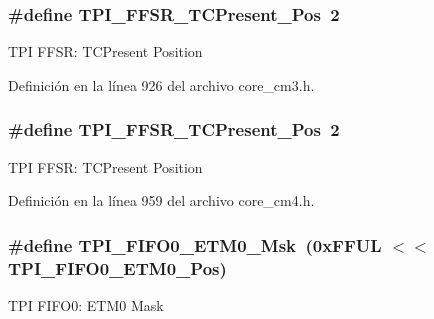 \subsubsection[{\texorpdfstring{T\+P\+I\+\_\+\+F\+F\+S\+R\+\_\+\+T\+C\+Present\+\_\+\+Pos}{TPI_FFSR_TCPresent_Pos}}]{\setlength{\rightskip}{0pt plus 5cm}\#define T\+P\+I\+\_\+\+F\+F\+S\+R\+\_\+\+T\+C\+Present\+\_\+\+Pos~2}\hypertarget{group___c_m_s_i_s___t_p_i_gad30fde0c058da2ffb2b0a213be7a1b5c}{}\label{group___c_m_s_i_s___t_p_i_gad30fde0c058da2ffb2b0a213be7a1b5c}
T\+PI F\+F\+SR\+: T\+C\+Present Position 

Definición en la línea 926 del archivo core\+\_\+cm3.\+h.

\subsubsection[{\texorpdfstring{T\+P\+I\+\_\+\+F\+F\+S\+R\+\_\+\+T\+C\+Present\+\_\+\+Pos}{TPI_FFSR_TCPresent_Pos}}]{\setlength{\rightskip}{0pt plus 5cm}\#define T\+P\+I\+\_\+\+F\+F\+S\+R\+\_\+\+T\+C\+Present\+\_\+\+Pos~2}\hypertarget{group___c_m_s_i_s___t_p_i_gad30fde0c058da2ffb2b0a213be7a1b5c}{}\label{group___c_m_s_i_s___t_p_i_gad30fde0c058da2ffb2b0a213be7a1b5c}
T\+PI F\+F\+SR\+: T\+C\+Present Position 

Definición en la línea 959 del archivo core\+\_\+cm4.\+h.

\subsubsection[{\texorpdfstring{T\+P\+I\+\_\+\+F\+I\+F\+O0\+\_\+\+E\+T\+M0\+\_\+\+Msk}{TPI_FIFO0_ETM0_Msk}}]{\setlength{\rightskip}{0pt plus 5cm}\#define T\+P\+I\+\_\+\+F\+I\+F\+O0\+\_\+\+E\+T\+M0\+\_\+\+Msk~(0x\+F\+F\+U\+L $<$$<$ T\+P\+I\+\_\+\+F\+I\+F\+O0\+\_\+\+E\+T\+M0\+\_\+\+Pos)}\hypertarget{group___c_m_s_i_s___t_p_i_gaf924f7d1662f3f6c1da12052390cb118}{}\label{group___c_m_s_i_s___t_p_i_gaf924f7d1662f3f6c1da12052390cb118}
T\+PI F\+I\+F\+O0\+: E\+T\+M0 Mask 


